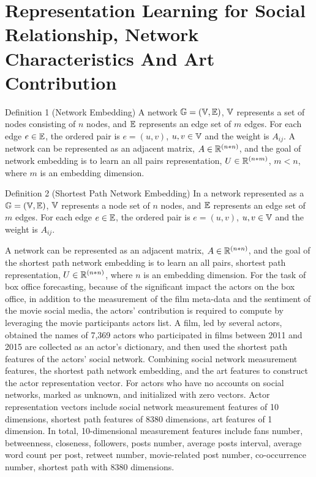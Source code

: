 \documentclass[review]{cvpr}
\begin{document}
\section{Representation Learning for Social Relationship, Network Characteristics And Art Contribution}

Definition 1 (Network Embedding)  A network $\Bbb G=(\Bbb V,\Bbb E)$, $\Bbb V$ represents a set of nodes consisting of $n$ nodes, and $\Bbb E$ represents an edge set of $m$ edges.
For each edge $e\in \Bbb E$, the ordered pair is $e=(u,v)$, $u,v \in \Bbb V$ and the weight is $A_{ij}$.
A network can be represented as an adjacent matrix, $A\in \Bbb R^{(n*n)}$, and the goal of network embedding is to learn an all pairs representation, $U\in \Bbb R^{(n*m)}$, $m < n$, where $m$ is an embedding dimension.\par
Definition 2 (Shortest Path Network Embedding)  In a network represented as a $\Bbb G=(\Bbb V,\Bbb E)$, $\Bbb V$ represents a node set of $n$ nodes, and $\Bbb E$ represents an edge set of $m$ edges.
For each edge $e\in \Bbb E$, the ordered pair is $e=(u,v)$, $u,v \in \Bbb V$ and the weight is $A_{ij}$.\par
A network can be represented as an adjacent matrix, $A\in \Bbb R^{(n*n)}$, and the goal of the shortest path network embedding is to learn an all pairs, shortest path representation, $U\in \Bbb R^{(n*n)}$, where $n$ is an embedding dimension.
For the task of box office forecasting, because of the significant impact the actors on the box office, in addition to the measurement of the film meta-data and the sentiment of the movie social media, the actors' contribution is required to compute by leveraging the movie participants actors list.
A film, led by several actors, obtained the names of 7,369 actors who participated in films between 2011 and 2015 are collected as an actor's dictionary, and then used the shortest path features of the actors' social network.
Combining social network measurement features, the shortest path network embedding, and the art features to construct the actor representation vector.
For actors who have no accounts on social networks, marked as unknown, and initialized with zero vectors.
Actor representation vectors include social network measurement features of 10 dimensions, shortest path features of 8380 dimensions, art features of 1 dimension.
In total, 10-dimensional measurement features include fans number, betweenness, closeness, followers, posts number, average posts interval, average word count per post, retweet number, movie-related post number, co-occurrence number, shortest path with 8380 dimensions.
\end{document}
